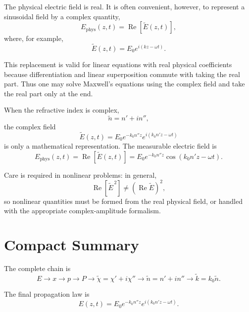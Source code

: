 \documentclass[11pt]{article}
\begin{document}
The physical electric field is real.  It is often convenient, however, to represent a sinusoidal field by a complex quantity,
\begin{equation}
E_{\mathrm{phys}}(z,t)
=
\operatorname{Re}\!\left[
\tilde{E}(z,t)
\right],
\end{equation}
where, for example,
\begin{equation}
\tilde{E}(z,t)
=
E_0 e^{i(kz-\omega t)}.
\end{equation}

This replacement is valid for linear equations with real physical coefficients because differentiation and linear superposition commute with taking the real part.  Thus one may solve Maxwell's equations using the complex field and take the real part only at the end.

When the refractive index is complex,
\begin{equation}
\tilde{n}=n'+in'',
\end{equation}
the complex field
\begin{equation}
\tilde{E}(z,t)
=
E_0 e^{-k_0n''z}
e^{i(k_0n'z-\omega t)}
\end{equation}
is only a mathematical representation.  The measurable electric field is
\begin{equation}
E_{\mathrm{phys}}(z,t)
=
\operatorname{Re}\!\left[\tilde{E}(z,t)\right]
=
E_0 e^{-k_0n''z}
\cos\!\left(k_0n'z-\omega t\right).
\end{equation}

Care is required in nonlinear problems: in general,
\begin{equation}
\operatorname{Re}\!\left[\tilde{E}^{\,2}\right]
\neq
\left(\operatorname{Re}\tilde{E}\right)^2,
\end{equation}
so nonlinear quantities must be formed from the real physical field, or handled with the appropriate complex-amplitude formalism.

\section*{Compact Summary}

The complete chain is
\begin{equation}
E
\rightarrow
x
\rightarrow
p
\rightarrow
P
\rightarrow
\tilde{\chi}=\chi'+i\chi''
\rightarrow
\tilde{n}=n'+in''
\rightarrow
\tilde{k}=k_0\tilde{n}.
\end{equation}

The final propagation law is
\begin{equation}
\boxed{
E(z,t)
=
E_0
e^{-k_0n''z}
e^{i(k_0n'z-\omega t)}
}.
\end{equation}
\end{document}
